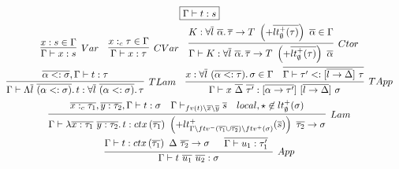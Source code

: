 \documentclass[acmsmall,review,screen]{acmart}
\newcommand{\mathframebox}[1]{\framebox{$\displaystyle #1$}}
\newcommand{\ap}{~}
\newcommand{\ctx}[1]{ctx\left(#1\right)~}
\begin{document}
\begin{figure}
    \begin{gather*}
        \mathframebox{\Gamma\vdash t : s} \\
        \begin{array}{ccc}
            \infer[Var]{\Gamma\vdash x : s}{x : s \in \Gamma} &
            \infer[CVar]{\Gamma\vdash x : \tau}{x :_c \tau \in \Gamma} &
            \infer[Ctor]{\Gamma\vdash K : \forall\overline{l}\ \overline{\alpha}\ldotp \overline{\tau}\to T \ap\left(+\overline{lt_\emptyset^+(\tau)}\right)\ap \overline{\alpha}}{K : \forall\overline{l}\ \overline{\alpha}\ldotp \overline{\tau}\to T \ap\left(+\overline{lt_\emptyset^+(\tau)}\right)\ap \overline{\alpha} \in \Gamma}
        \end{array} \\
        \begin{array}{cc}
            \infer[TLam]{
                \Gamma\vdash\Lambda\overline{l}\ap\overline{(\alpha <: \sigma)}\ldotp t : \forall\overline{l}\ap\overline{(\alpha <: \sigma)}\ldotp\tau
            }{
                \overline{\alpha <: \sigma}, \Gamma\vdash t : \tau
            } &
            \infer[TApp]{
                \Gamma\vdash x\ap\overline{\Delta}\ap\overline{\tau'} : [\overline{\alpha\to\tau'}]\ap[\overline{l\to\Delta}]\ap\sigma
            }{
                x : \forall\overline{l}\ap(\overline{\alpha <: \tau})\ldotp \sigma \in \Gamma
                &
                \overline{\Gamma\vdash\tau' <: [\overline{l\to\Delta}]\ap\tau}
            }
        \end{array} \\
        \infer[Lam]{
            \Gamma\vdash \lambda \overline{x : \tau_1} ~ \overline{y : \tau_2} \ldotp t : \ctx{\overline{\tau_1}} \left(+{lt_{\Gamma\setminus ftv^-(\overline{\tau_1}\cup\overline{\tau_2}) \setminus ftv^+(\sigma)}^+(\overline{s})}\right)~ \overline{\tau_2} \to \sigma
        }{
            \overline{x :_c \tau_1}, \overline{y : \tau_2}, \Gamma\vdash t : \sigma
            &
            \Gamma\vdash_{fv(t)\setminus \overline{x}\setminus\overline{y}}\overline{s}
            &
            local, \star \not\in lt_\emptyset^+(\sigma)
        } \\
        \infer[App]{
            \Gamma\vdash t \ap \overline{u_1} \ap \overline{u_2} : \sigma
        } {
            \Gamma\vdash t : \ctx{\overline{\tau_1}} \Delta~\overline{\tau_2}\to\sigma
            &
            \begin{array}{c}
                \overline{\Gamma\vdash u_1 : \tau_1'} \\

\end{array}}
\end{gather*}
\end{figure}
\end{document}
